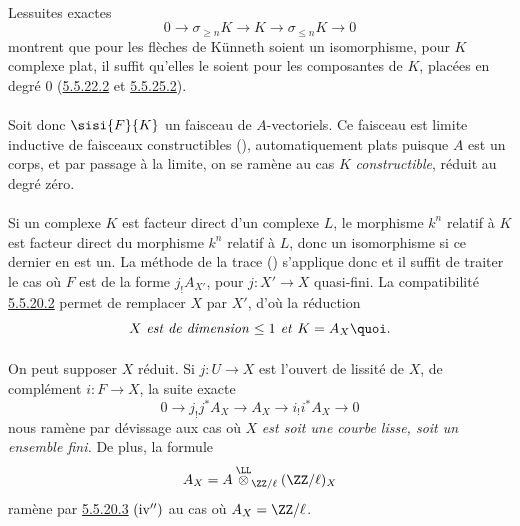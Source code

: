 \documentclass[10pt]{../fichiers-configuration-latex/smfart}
\begin{document}
\paragraph{}
Les\pageoriginale suites exactes
$$
0\longrightarrow \sigma_{\geq n} K\longrightarrow K\longrightarrow
\sigma_{\leq n} K\longrightarrow 0
$$
montrent que pour les flèches de Künneth soient un isomorphisme, pour
$K$ complexe plat, il suffit qu'elles le soient pour les composantes
de $K$, placées en degré $0$ (\hyperref[XVII.lem5.5.22.2]{5.5.22.2}\sisi{)}{} et \sisi{(}{}\hyperref[XVII.par5.5.25.2]{5.5.25.2}).

\paragraph{}
Soit donc $\sisi{F}{K}$ un faisceau de $A$-vectoriels. Ce faisceau est limite
inductive de faisceaux constructibles (), automatiquement
plats puisque $A$ est un corps, et par passage à la limite, on se
ramène au cas $K$ \emph{constructible}, réduit au degré zéro.

\paragraph{}
Si un complexe $K$ est facteur direct d'un complexe $L$, le morphisme
$k^{n}$ relatif à $K$ est facteur direct du morphisme $k^{n}$ relatif
à $L$, donc un isomorphisme si ce dernier en est un. La méthode de la
trace () s'applique donc et il suffit de traiter le cas où $F$
est de la forme $j_{!}A_{X'}$, pour $j:X'\rightarrow X$ quasi-fini. La
compatibilité \hyperref[XVII.par5.5.20.2]{5.5.20.2} permet de remplacer $X$ par $X'$, d'où la
réduction
$$
\mbox{$X$ \emph{est de dimension $\leq 1$ et} $K=A_{X}${\quoi}.}
$$

\paragraph{}
On peut supposer $X$ réduit. Si $j:U\rightarrow X$ est l'ouvert de
lissité de $X$, de complément $i:F\rightarrow X$, la suite exacte
$$
0\longrightarrow j_{!}j^{\ast}A_{X}\longrightarrow
A_{X}\longrightarrow i_{!}i^{\ast}A_{X}\longrightarrow 0
$$
nous ramène par dévissage aux cas où $X$ \emph{est soit une courbe
lisse, soit un ensemble fini.} De plus, la formule
$$
A_{X}=A\overset{\LL}{\otimes}_{\ZZ/\ell}(\ZZ/\ell)_{X}
$$
ramène par \hyperref[XVII.par5.5.20.3]{5.5.20.3} ${\rm(iv'')}$ au cas où $A_{X}=\ZZ/\ell$.
\end{document}
